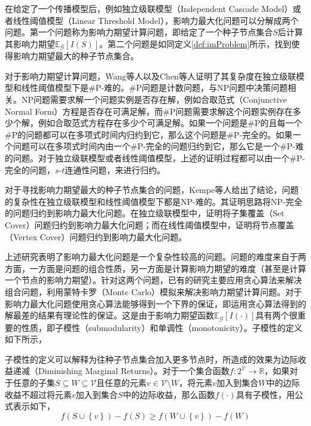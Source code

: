 在给定了一个传播模型后，例如独立级联模型（Independent Cascade Model）或者线性阈值模型（Linear Threshold Model），影响力最大化问题可以分解成两个问题。第一个问题称为影响力期望计算问题，即给定了一个种子节点集合$S$后计算其影响力期望$\mathbb{E}_\mathcal{G}\left[I\left(S\right)\right]$。第二个问题是如同定义\ref{def:imProblem}所示，找到使得影响力期望最大的种子节点集合。

对于影响力期望计算问题，Wang等人以及Chen等人证明了其复杂度在独立级联模型和线性阈值模型下是\#P-难的。\#P问题是计数问题，与NP问题中决策问题相关。NP问题需要求解一个问题实例是否存在解，例如合取范式（Conjunctive Normal Form）方程是否存在可满足解，而\#P问题需要求解这个问题实例存在多少个解，例如合取范式方程存在多少个可满足解。如果一个问题是\#P的且每一个\#P的问题都可以在多项式时间内归约到它，那么这个问题是\#P-完全的。如果一个问题可以在多项式时间内由一个\#P-完全的问题归约到它，那么它是一个\#P-难的问题。对于独立级联模型或者线性阈值模型，上述的证明过程都可以由一个\#P-完全的问题，$s$-$t$连通性问题，来进行归约。

对于寻找影响力期望最大的种子节点集合的问题，Kempe等人给出了结论，问题的复杂性在独立级联模型和线性阈值模型下都是NP-难的。其证明思路将NP-完全的问题归约到影响力最大化问题。在独立级联模型中，证明将子集覆盖（Set Cover）问题归约到影响力最大化问题；而在线性阈值模型中，证明将节点覆盖（Vertex Cover）问题归约到影响力最大化问题。

上述研究表明了影响力最大化问题是一个复杂性较高的问题。问题的难度来自于两方面，一方面是问题的组合性质，另一方面是计算影响力期望的难度（甚至是计算一个节点的影响力期望）。针对这两个问题，已有的研究主要应用贪心算法来解决组合问题，利用蒙特卡罗（Monte Carlo）模拟来解决影响力期望计算问题。对于影响力最大化问题使用贪心算法能够得到一个下界的保证，即运用贪心算法得到的解最差的结果有理论性的保证。这是由于影响力期望函数$\mathbb{E}_\mathcal{G}\left[I\left(\cdot\right)\right]$具有两个很重要的性质，即子模性（submodularity）和单调性（monotonicity）。子模性的定义如下所示，
\begin{defn}[子模性]
\label{def:submodularity}
子模性的定义可以解释为往种子节点集合加入更多节点时，所造成的效果为边际收益递减（Diminishing Marginal Returns）。对于一个集合函数$f:2^{\mathcal{V}} \rightarrow \mathbb{R}$，如果对于任意的子集$S \subseteq W \subseteq \mathcal{V}$且任意的元素$v \in \mathcal{V} \setminus W$，将元素$v$加入到集合$W$中的边际收益不超过将元素$v$加入到集合$S$中的边际收益，那么函数$f\left( \cdot \right)$具有子模性，用公式表示如下，
\begin{equation}
\label{eq:submodularity}
	f\left(S\cup\left\{v\right\}\right) - f\left(S\right) \geq f\left(W\cup\left\{v\right\}\right) - f\left(W\right)
\end{equation}
\end{defn}

